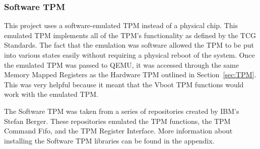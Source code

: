 \documentclass[../report.tex]{subfiles}
\begin{document}
\subsubsection{Software TPM}

This project uses a software-emulated TPM instead of a physical chip. 
This emulated TPM implements all of the TPM's functionality as defined by the
TCG Standards.
The fact that the emulation was software allowed the TPM to be put into various
states easily without requiring a physical reboot of the system.
Once the emulated TPM was passed to QEMU, it was accessed through the same
Memory Mapped Registers as the Hardware TPM outlined in Section~\ref{sec:TPM}.
This was very helpful because it meant that the Vboot TPM functions would work
with the emulated TPM.

The Software TPM was taken from a series of repositories created by IBM's
Stefan Berger. 
These repositories emulated the TPM functions\cite{TPMLibs}, the TPM Command
Fifo\cite{SWTPM}, and the TPM Register Interface\cite{TPMQEMU}. 
More information about installing the Software TPM libraries can be found in the
appendix.

\end{document}
